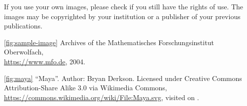 \documentclass{snapshotmfo}
\begin{document}
If you use your own images, please check if you still have the rights of use. The images may be copyrighted by your institution or a publisher of your previous publications.

\clearpage

\begin{imagecredits}
  \item[\autoref{fig:sample-image}] Archives of the Mathematisches Forschungsinstitut Oberwolfach,\\\url{https://www.mfo.de}, 2004.
  \item[\autoref{fig:maya}] ``Maya''. Author: Bryan Derkson. Licensed under Creative Commons Attribution-Share Alike 3.0 via Wikimedia Commons, \url{https://commons.wikimedia.org/wiki/File:Maya.svg}, visited on .
\end{imagecredits}


\end{document}
